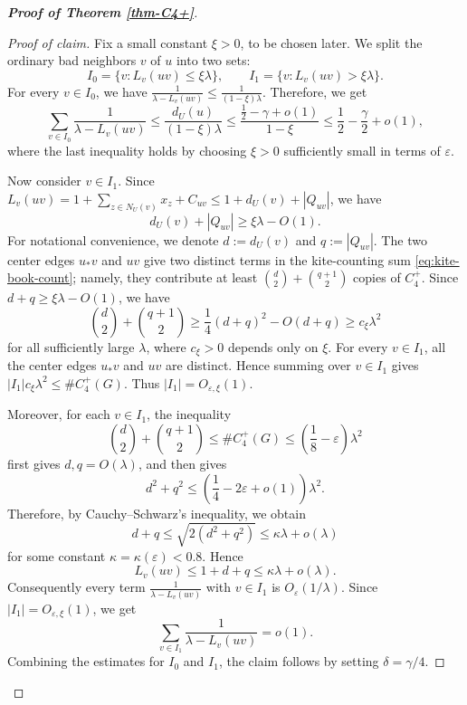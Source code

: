 \documentclass[10pt,a4paper]{amsart}
\renewcommand{\le}{\leqslant}
\renewcommand{\ge}{\geqslant}
\begin{document}
\begin{proof}[{\bf Proof of Theorem \ref{thm-C4+}}]
\begin{proof}[Proof of claim]
Fix a small constant \(\xi>0\), to be chosen later. We split the ordinary bad
neighbors \(v\) of \(u\) into two sets:
\[
        I_0=\{v:L_v(uv)\le \xi\lambda\},
        \qquad
        I_1=\{v:L_v(uv)>\xi\lambda\}.
\]
For every \(v\in I_0\), we have 
$  \frac{1}{\lambda-L_v(uv)}
        \le
        \frac{1}{(1-\xi)\lambda}$. 
Therefore, we get 
\[
        \sum_{v\in I_0}\frac{1}{\lambda-L_v(uv)}
        \le
        \frac{d_U(u)}{(1-\xi)\lambda}
        \le
        \frac{\frac12-\gamma+o(1)}{1-\xi} \le   \frac12-\frac{\gamma}{2}+o(1),
\]
where the last inequality holds by 
choosing \(\xi>0\) sufficiently small in terms of \(\varepsilon\). 

Now consider \(v\in I_1\).  Since
$   L_v(uv)=1+ \sum_{z\in N_U(v)}x_z +C_{uv}\le 1+d_U(v)+|Q_{uv}|$, 
we have
\[
        d_U(v)+|Q_{uv}| \ge \xi\lambda-O(1).
\]
For notational convenience, we denote 
$ d:=d_U(v)$ and  $q:=|Q_{uv}|$. 
The two center edges \(u_*v\) and \(uv\) give two distinct terms in the
kite-counting sum \eqref{eq:kite-book-count}; namely, they contribute at least
$  {d\choose2}+{q+1\choose2}$ 
copies of $C_4^+$.  Since \(d+q\ge\xi\lambda-O(1)\), we have
\[
        {d\choose2}+{q+1\choose2}
        \ge
        \frac14(d+q)^2-O(d+q)
        \ge
        c_\xi\lambda^2
\]
for all sufficiently large \(\lambda\), where \(c_\xi>0\) depends only on
\(\xi\).  For every $v\in I_1$, all the center edges \(u_*v\) and \(uv\) are
distinct.  Hence summing over \(v\in I_1\) gives
$  |I_1|c_\xi\lambda^2\le  \texttt{\#}{C_4^+}(G)$.
Thus \(|I_1|=O_{\varepsilon,\xi}(1)\).

Moreover, for each \(v\in I_1\), the inequality
\[
        {d\choose2}+{q+1\choose2}
        \le  \texttt{\#}{C_4^+}(G)
        \le
        \left(\frac18-\varepsilon\right)\lambda^2
\]
first gives \(d,q=O(\lambda)\), and then gives
\[
        d^2+q^2
        \le
        \left(\frac14-2\varepsilon+o(1)\right)\lambda^2.
\]
Therefore, by Cauchy--Schwarz's inequality, we obtain 
\[
        d+q
        \le
        \sqrt{2(d^2+q^2)}
        \le
        \kappa\lambda+o(\lambda)
\]
for some constant \(\kappa=\kappa(\varepsilon)<0.8\).  Hence
\[
        L_v(uv)\le 1+d+q\le \kappa\lambda+o(\lambda).
\]
Consequently every term $\frac{1}{\lambda - L_v(uv)}$ with \(v\in I_1\) is \(O_\varepsilon(1/\lambda)\).
Since \(|I_1|=O_{\varepsilon,\xi}(1)\), we get
\[
        \sum_{v\in I_1}\frac{1}{\lambda-L_v(uv)}=o(1).
\]
Combining the estimates for \(I_0\) and \(I_1\), the claim follows by setting \(\delta=\gamma/4\).
\end{proof}


\end{proof}
\end{document}
